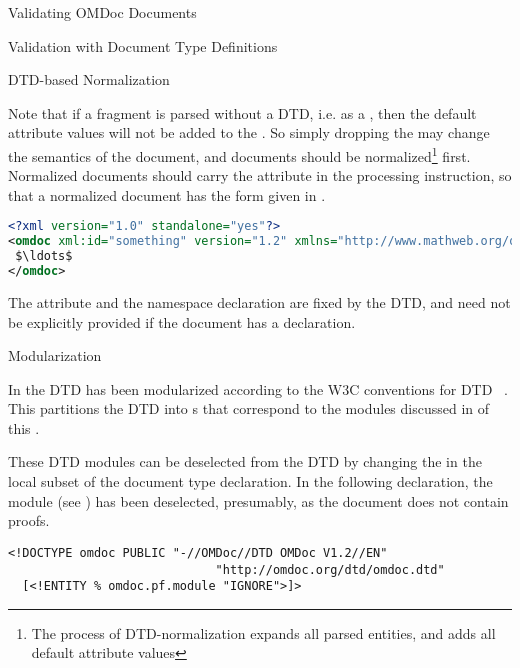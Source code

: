 \begin{tchapter}[id=validating]{Validating OMDoc Documents}
\begin{tsection}[id=validate-dtd]{Validation with Document Type Definitions}
\begin{tsubsection}[id=dtd-normalization]{DTD-based Normalization}
  
  Note that if a {\omdoc} fragment is parsed without a DTD, i.e. as a
  {} {\xml} {}, then the default attribute
  values will not be added to the {\xml}
  {}. So simply dropping the {}
  may change the semantics of the document, and {\omdoc} documents should be
  normalized\footnote{The process of DTD-normalization expands all parsed {\xml} entities,
    and adds all default attribute values} first.  Normalized
  {\omdoc} documents should carry the {} attribute in the
  {\xml} processing instruction, so that a normalized {\omdoc} document has the form given
  in {}.

\begin{lstlisting}[label=lst:normalized,language=XML,morekeywords={omdoc},mathescape,
  caption={A normalized {\omdoc} document without DTD},index={xml,omdoc}]
<?xml version="1.0" standalone="yes"?>
<omdoc xml:id="something" version="1.2" xmlns="http://www.mathweb.org/omdoc">
 $\ldots$
</omdoc>
\end{lstlisting}

The attribute {} and the namespace declaration
{} are fixed by the DTD, and need not be explicitly provided if the
document has a {} declaration.
\end{tsubsection}


\begin{tsubsection}[id=modularization]{Modularization}

  In {} the DTD has been modularized according to the W3C conventions
  for DTD {}~\cite{AltBou:mox01}. This partitions the DTD
  into  {s} that correspond to the {\omdoc} modules
  discussed in {} of this {\report}. 

  These DTD modules can be deselected from the {\omdoc} DTD by changing the
  {} in the
  local subset of the document type declaration. In the following declaration, the
  module {} (see {}) has been deselected,
  presumably, as the document does not contain proofs.

\begin{lstlisting}[index={omdoc,DOCTYPE,ENTITY,INGNORE}]
<!DOCTYPE omdoc PUBLIC "-//OMDoc//DTD OMDoc V1.2//EN"
                             "http://omdoc.org/dtd/omdoc.dtd"
  [<!ENTITY % omdoc.pf.module "IGNORE">]>
\end{lstlisting}


\end{tsubsection}
\end{tsection}
\end{tchapter}
